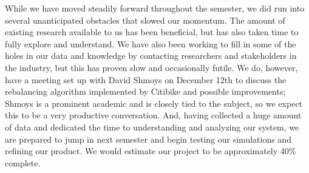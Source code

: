 \documentclass{sig-alternate}
\begin{document}
While we have moved steadily forward throughout the semester, we did run into several unanticipated obstacles that slowed our momentum. The amount of existing research available to us has been beneficial, but has also taken time to fully explore and understand. We have also been working to fill in some of the holes in our data and knowledge by contacting researchers and stakeholders in the industry, but this has proven slow and occasionally futile. We do, however, have a meeting set up with David Shmoys on December 12th to discuss the rebalancing algorithm implemented by Citibike and possible improvements; Shmoys is a prominent academic and is closely tied to the subject, so we expect this to be a very productive conversation. And, having collected a huge amount of data and dedicated the time to understanding and analyzing our system, we are prepared to jump in next semester and begin testing our simulations and refining our product. We would estimate our project to be approximately 40\% complete.
\end{document}
